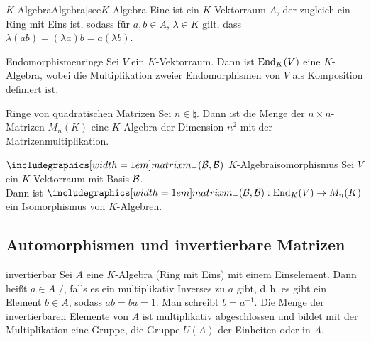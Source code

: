 
\begin{xDef}{$K$-Algebra}{Algebra|see{$K$-Algebra}}
    Eine  ist ein $K$-Vektorraum
    $A$, der zugleich ein Ring mit Eins ist,
    sodass für $a, b \in A$, $\lambda \in K$
    gilt, dass $\lambda (ab) = (\lambda a) b = a (\lambda b)$.
\end{xDef}

\begin{Satz}{Endomorphismenringe}
    Sei $V$ ein $K$-Vektorraum.
    Dann ist $\operatorname{End}_K(V)$ eine $K$-Algebra, wobei die Multiplikation zweier
    Endomorphismen von $V$ als Komposition definiert ist.
\end{Satz}

\begin{Satz}{Ringe von quadratischen Matrizen}
    Sei $n \in \natural$.
    Dann ist die Menge der $n \times n$-Matrizen $M_n(K)$ eine $K$-Algebra
    der Dimension $n^2$ mit der Matrizenmultiplikation.
\end{Satz}

\begin{Satz}{$\hommatrix{-}{B}{B}$ $K$-Algebraisomorphismus}
    Sei $V$ ein $K$-Vektorraum mit Basis $\mathcal{B}$. \\
    Dann ist $\hommatrix{-}{B}{B}: \End_K(V) \rightarrow M_n(K)$
    ein Isomorphismus von $K$-Algebren.
\end{Satz}

\subsection{%
    Automorphismen und invertierbare Matrizen%
}

\begin{Def}{invertierbar}
    Sei $A$ eine $K$-Algebra (Ring mit Eins) mit einem Einselement.
    Dann heißt $a \in A$ /, falls es
    ein multiplikativ Inverses zu $a$ gibt, d.\,h. es gibt ein Element
    $b \in A$, sodass $ab = ba = 1$.
    Man schreibt $b = a^{-1}$.
    Die Menge der invertierbaren Elemente von $A$ ist multiplikativ
    abgeschlossen und bildet mit der Multiplikation eine Gruppe, die Gruppe
    $U(A)$ der Einheiten oder  in $A$.
\end{Def}

